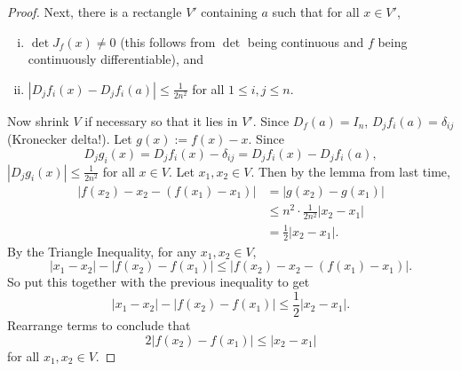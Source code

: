 \documentclass[12pt]{article}
\newcommand{\paren}[1]{\left( #1 \right)}
\theoremstyle{definition}
\theoremstyle{remark}
\begin{document}
\begin{proof}
    Next, there is a rectangle $V'$ containing $a$ such that for all $x \in V'$,
    \begin{enumerate}[(i)]
        \item $\det J_f(x) \neq 0$ (this follows from $\det$ being continuous and $f$ being continuously differentiable), and
        \item $|D_jf_i(x) - D_jf_i(a)| \leq \frac{1}{2n^2}$ for all $1 \leq i , j \leq n$.
    \end{enumerate}
    Now shrink $V$ if necessary so that it lies in $V'$. Since $D_f(a) = I_n$, $D_jf_i(a) = \delta_{ij}$ (Kronecker delta!). Let $g(x) := f(x) - x$. Since 
    \[
        D_jg_i(x) = D_jf_i(x) - \delta_{ij} = D_jf_i(x) - D_jf_i(a),
    \]
    $|D_jg_i(x)| \leq \frac{1}{2n^2}$ for all $x \in V$. Let $x_1 , x_2 \in V$. Then by the lemma from last time, 
    \begin{align*}
        \left| f(x_2) - x_2 - \paren{f(x_1) - x_1} \right| & = |g(x_2) - g(x_1)| \\
        & \leq n^2 \cdot \frac{1}{2n^2}|x_2 - x_1| \\
        & = \frac{1}{2}|x_2 - x_1|.
    \end{align*}
    By the Triangle Inequality, for any $x_1 , x_2 \in V$, 
    \[
        |x_1 - x_2| - |f(x_2) - f(x_1)| \leq \left| f(x_2) - x_2 - \paren{f(x_1) - x_1} \right|.
    \]
    So put this together with the previous inequality to get 
    \[
        |x_1 - x_2| - |f(x_2) - f(x_1)| \leq \frac{1}{2}|x_2 - x_1|.
    \]
    Rearrange terms to conclude that 
    \[
        2|f(x_2) - f(x_1)| \leq |x_2 - x_1|
    \]
    for all $x_1 , x_2 \in V$.
    

\end{proof}
\end{document}
